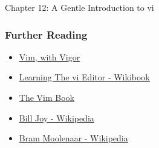 \begin{notes}{Chapter 12: A Gentle Introduction to vi}
    \subsubsection*{Further Reading}

    \begin{itemize}
        \item \href{http://linuxcommand.org/lc3_adv_vimvigor.php}{Vim, with Vigor}
        \item \href{http://en.wikibooks.org/wiki/Vi}{Learning The vi Editor - Wikibook}
        \item \href{ftp://ftp.vim.org/pub/vim/doc/book/vimbook-OPL.pdf}{The Vim Book}
        \item \href{http://en.wikipedia.org/wiki/Bill_Joy}{Bill Joy - Wikipedia}
        \item \href{http://en.wikipedia.org/wiki/Bram_Moolenaar}{Bram Moolenaar - Wikipedia}
    \end{itemize}
\end{notes}